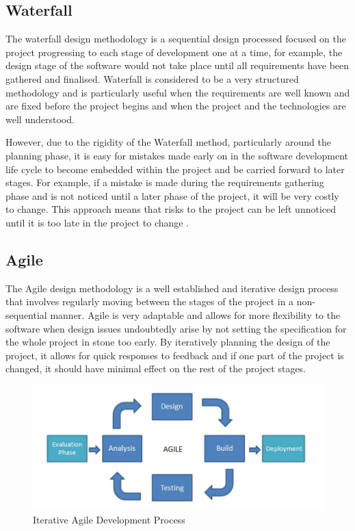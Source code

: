 \subsection{Waterfall}
The waterfall design methodology is a sequential design processed focused on the project progressing to each stage of development one at a time, for example, the design stage of the software would not take place until all requirements have been gathered and finalised.
Waterfall is considered to be a very structured methodology and is particularly useful when the requirements are well known and are fixed before the project begins and when the project and the technologies are well understood.

However, due to the rigidity of the Waterfall method, particularly around the planning phase, it is easy for mistakes made early on in the software development life cycle to become embedded within the project and be carried forward to later stages.
For example, if a mistake is made during the requirements gathering phase and is not noticed until a later phase of the project, it will be very costly to change.
This approach means that risks to the project can be left unnoticed until it is too late in the project to change \cite{kruchten2001waterfall}.

\subsection{Agile}
The Agile design methodology is a well established and iterative design process that involves regularly moving between the stages of the project in a non-sequential manner. 
Agile is very adaptable and allows for more flexibility to the software when design issues undoubtedly arise by not setting the specification for the whole project in stone too early.
By iteratively planning the design of the project, it allows for quick responses to feedback and if one part of the project is changed, it should have minimal effect on the rest of the project stages. 

\begin{figure}[ht]
	\centering
	\includegraphics[scale=0.4]{images/Agile_Image.jpg}
	\caption{Iterative Agile Development Process}
	\label{fig:AndroidVersions}
\end{figure}

